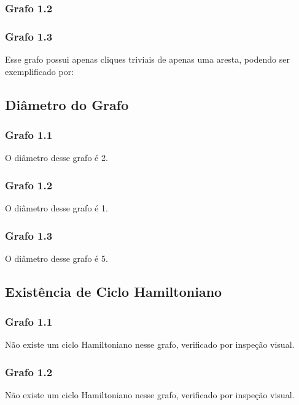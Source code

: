\documentclass{article}
\begin{document}
\subsubsection{Grafo 1.2}
\subsubsection{Grafo 1.3}
Esse grafo possui apenas cliques triviais de apenas uma aresta, podendo ser exemplificado por:
\smallbreak
{}
\subsection{Diâmetro do Grafo}
\subsubsection{Grafo 1.1}
O diâmetro desse grafo é 2.
\subsubsection{Grafo 1.2}
O diâmetro desse grafo é 1.
\subsubsection{Grafo 1.3}
O diâmetro desse grafo é 5.
\subsection{Existência de Ciclo Hamiltoniano}
\subsubsection{Grafo 1.1}
Não existe um ciclo Hamiltoniano nesse grafo, verificado por inspeção visual.
\subsubsection{Grafo 1.2}
Não existe um ciclo Hamiltoniano nesse grafo, verificado por inspeção visual.
\end{document}
